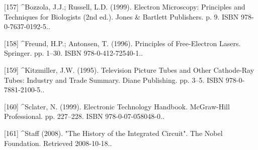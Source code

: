 [157]
^Bozzola, J.J.; Russell, L.D. (1999). Electron Microscopy: Principles and Techniques for Biologists (2nd ed.). Jones & Bartlett Publishers. p. 9. ISBN 978-0-7637-0192-5..

[158]
^Freund, H.P.; Antonsen, T. (1996). Principles of Free-Electron Lasers. Springer. pp. 1–30. ISBN 978-0-412-72540-1..

[159]
^Kitzmiller, J.W. (1995). Television Picture Tubes and Other Cathode-Ray Tubes: Industry and Trade Summary. Diane Publishing. pp. 3–5. ISBN 978-0-7881-2100-5..

[160]
^Sclater, N. (1999). Electronic Technology Handbook. McGraw-Hill Professional. pp. 227–228. ISBN 978-0-07-058048-0..

[161]
^Staff (2008). "The History of the Integrated Circuit". The Nobel Foundation. Retrieved 2008-10-18..